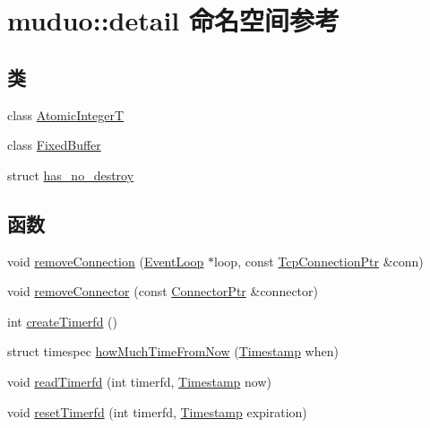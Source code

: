 \hypertarget{namespacemuduo_1_1detail}{}\section{muduo\+:\+:detail 命名空间参考}
\label{namespacemuduo_1_1detail}
\subsection*{类}
\begin{DoxyCompactItemize}
\item 
class \hyperlink{classmuduo_1_1detail_1_1AtomicIntegerT}{Atomic\+IntegerT}
\item 
class \hyperlink{classmuduo_1_1detail_1_1FixedBuffer}{Fixed\+Buffer}
\item 
struct \hyperlink{structmuduo_1_1detail_1_1has__no__destroy}{has\+\_\+no\+\_\+destroy}
\end{DoxyCompactItemize}
\subsection*{函数}
\begin{DoxyCompactItemize}
\item 
void \hyperlink{namespacemuduo_1_1detail_ae3e6bfc20f665df13eeb2ebc3c91abce}{remove\+Connection} (\hyperlink{classmuduo_1_1EventLoop}{Event\+Loop} $\ast$loop, const \hyperlink{namespacemuduo_a40c45128e9700d337d92f3cbb8dd4a0a}{Tcp\+Connection\+Ptr} \&conn)
\item 
void \hyperlink{namespacemuduo_1_1detail_ab9f5e26fda4b27382acd5a0740a83137}{remove\+Connector} (const \hyperlink{namespacemuduo_a144f8adea97b4c9ac75c439f6d87ae29}{Connector\+Ptr} \&connector)
\item 
int \hyperlink{namespacemuduo_1_1detail_af278c30c3aaaf596fb0d2211bac2ff52}{create\+Timerfd} ()
\item 
struct timespec \hyperlink{namespacemuduo_1_1detail_a14924335d79da967a69c650af3002c77}{how\+Much\+Time\+From\+Now} (\hyperlink{classmuduo_1_1Timestamp}{Timestamp} when)
\item 
void \hyperlink{namespacemuduo_1_1detail_a08d79eafe298b7df1941adb4105bf75a}{read\+Timerfd} (int timerfd, \hyperlink{classmuduo_1_1Timestamp}{Timestamp} now)
\item 
void \hyperlink{namespacemuduo_1_1detail_a2a30bb501e8d9bb2da91ab353d1bc6fd}{reset\+Timerfd} (int timerfd, \hyperlink{classmuduo_1_1Timestamp}{Timestamp} expiration)
\end{DoxyCompactItemize}
